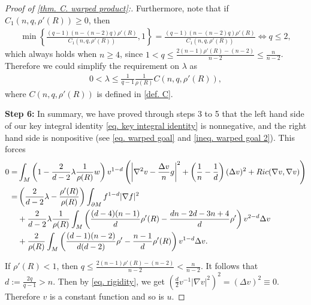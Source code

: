 \documentclass[12pt]{amsart}%
\numberwithin{equation}{section}
\numberwithin{lemma}{section}
\numberwithin{proposition}{section}
\numberwithin{corollary}{section}
\numberwithin{remark}{section}
\begin{document}
\begin{proof}[Proof of \cref{thm. C. warped product}:]
        Furthermore, note that if $C_1(n,q,\rho'(R))\geq 0$, then
        \begin{align*}
            \min\left\{
            \frac{(q-1)(n-(n-2)q)\rho'(R)}{C_1(n,q,\rho'(R))},
            1
            \right\}
            =\frac{(q-1)(n-(n-2)q)\rho'(R)}{C_1(n,q,\rho'(R))}
            \Longleftrightarrow
            q\leq 2,
        \end{align*}
        which always holds when $n\geq 4$, since $1<q\leq \frac{2(n-1)\rho'(R)-(n-2)}{n-2}\leq \frac{n}{n-2}$. Therefore we could simplify the requirement on $\lambda$ as 
        \begin{align*}
            0<\lambda\leq \frac{1}{q-1}\frac{1}{\rho(R)}C(n,q,\rho'(R)),
        \end{align*}
        where $C(n,q,\rho'(R))$ is defined in \cref{def. C}.
        
        

        \textbf{Step 6:} In summary, we have proved through steps 3 to 5 that the left hand side of our key integral identity \cref{eq. key integral identity} is nonnegative, and the right hand side is nonpositive (see \cref{eq. warped goal} and \cref{ineq. warped goal 2}). This forces
        \begin{align}\label{eq. rigidity}
            0=&\int_M \left(1-\frac{2}{d-2}\lambda\frac{1}{\rho(R)}w\right)
        v^{1-d}\left(
        \left|\nabla^2v-\frac{\Delta v}{n}g\right|^2
        +\left(\frac{1}{n}-\frac{1}{d}\right)(\Delta v)^2
        +Ric(\nabla v,\nabla v)
        \right)\notag\\
        =&\left(\frac{2}{d-2}\lambda-\frac{\rho'(R)}{\rho(R)}\right)\int_{\partial M}f^{1-d}|\nabla f|^2\notag\\
        &
        +\frac{2}{d-2}\lambda\frac{1}{\rho(R)}
        \int_M
        \left(
        \frac{(d-4)(n-1)}{d}\rho'(R)-\frac{dn-2d-3n+4}{d}\rho'
        \right)
         v^{2-d}\Delta v\notag
        \\
        &+\frac{2}{\rho(R)}\int_M 
        \left(\frac{(d-1)(n-2)}{d(d-2)}\rho'
        -\frac{n-1}{d}\rho'(R)
        \right)
        v^{1-d}\Delta v.
        \end{align}

        If $\rho'(R)<1$, then $q\leq \frac{2(n-1)\rho'(R)-(n-2)}{n-2}<\frac{n}{n-2}$. It follows that $d:=\frac{2q}{q-1}>n$. 
        Then by \cref{eq. rigidity}, we get
         $(\frac{d}{2}v^{-1}|\nabla v|^2)^2=(\Delta v)^2\equiv 0$. Therefore $v$ is a constant function and so is $u$.


\end{proof}
\end{document}
